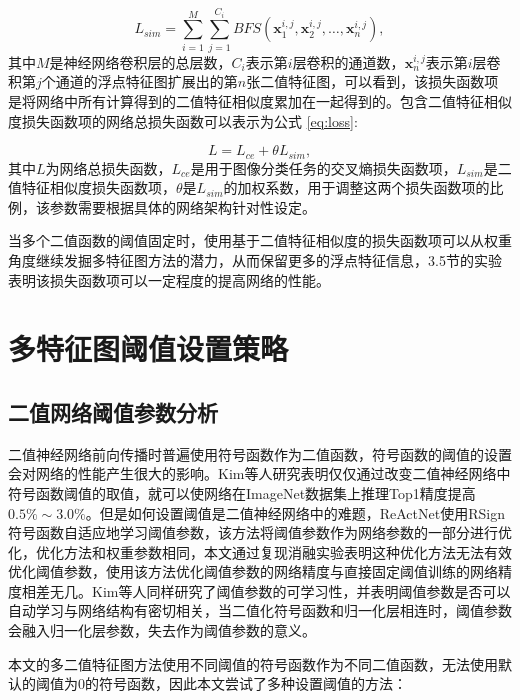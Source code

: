 \begin{equation}
  \label{eq:loss_sim}
  L_{sim} = \sum_{i = 1}^{M} \sum_{j = 1}^{C_i} BFS(\bm{x}_1^{i, j}, \bm{x}_2^{i, j}, \dots, \bm{x}_n^{i, j}),
\end{equation}
其中$M$是神经网络卷积层的总层数，$C_i$表示第$i$层卷积的通道数，$\bm{x}_n^{i, j}$表示第$i$层卷积第$j$个通道的浮点特征图扩展出的第$n$张二值特征图，可以看到，该损失函数项是将网络中所有计算得到的二值特征相似度累加在一起得到的。包含二值特征相似度损失函数项的网络总损失函数可以表示为公式 \eqref{eq:loss}:

\begin{equation}
  \label{eq:loss}
  L = L_{ce} + \theta L_{sim},
\end{equation}
其中$L$为网络总损失函数，$L_{ce}$是用于图像分类任务的交叉熵损失函数项，$L_{sim}$是二值特征相似度损失函数项，$\theta$是$L_{sim}$的加权系数，用于调整这两个损失函数项的比例，该参数需要根据具体的网络架构针对性设定。

当多个二值函数的阈值固定时，使用基于二值特征相似度的损失函数项可以从权重角度继续发掘多特征图方法的潜力，从而保留更多的浮点特征信息，3.5节的实验表明该损失函数项可以一定程度的提高网络的性能。

\section{多特征图阈值设置策略}

\subsection{二值网络阈值参数分析}

二值神经网络前向传播时普遍使用符号函数作为二值函数，符号函数的阈值的设置会对网络的性能产生很大的影响。Kim等人研究\cite{unbalance}表明仅仅通过改变二值神经网络中符号函数阈值的取值，就可以使网络在ImageNet数据集上推理Top1精度提高$0.5\% \sim 3.0\%$。但是如何设置阈值是二值神经网络中的难题，ReActNet\cite{reactnet}使用RSign符号函数自适应地学习阈值参数，该方法将阈值参数作为网络参数的一部分进行优化，优化方法和权重参数相同，本文通过复现消融实验表明这种优化方法无法有效优化阈值参数，使用该方法优化阈值参数的网络精度与直接固定阈值训练的网络精度相差无几。Kim等人\cite{unbalance}同样研究了阈值参数的可学习性，并表明阈值参数是否可以自动学习与网络结构有密切相关，当二值化符号函数和归一化层相连时，阈值参数会融入归一化层参数，失去作为阈值参数的意义。

本文的多二值特征图方法使用不同阈值的符号函数作为不同二值函数，无法使用默认的阈值为0的符号函数，因此本文尝试了多种设置阈值的方法：

